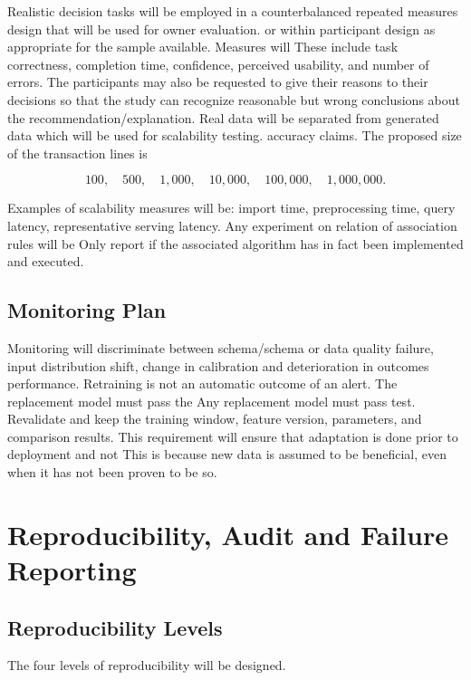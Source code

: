 \documentclass[a4paper,11pt,oneside]{book}
\theoremstyle{plain}
\theoremstyle{definition}
\theoremstyle{remark}
\begin{document}
Realistic decision tasks will be employed in a counterbalanced repeated measures design that will be used for owner evaluation. or within participant design as appropriate for the sample available. Measures will These include task correctness, completion time, confidence, perceived usability, and number of errors. The participants may also be requested to give their reasons to their decisions so that the study can recognize reasonable but wrong conclusions about the recommendation/explanation. Real data will be separated from generated data which will be used for scalability testing. accuracy claims. The proposed size of the transaction lines is

\[
100,\quad 500,\quad 1{,}000,\quad 10{,}000,\quad 100{,}000,\quad 1{,}000{,}000.
\]

Examples of scalability measures will be: import time, preprocessing time, query latency, representative serving latency. Any experiment on relation of association rules will be Only report if the associated algorithm has in fact been implemented and executed.

\subsection{Monitoring Plan}
\label{subsec:monitoring_plan}

Monitoring will discriminate between schema/schema or data quality failure, input distribution shift, change in calibration and deterioration in outcomes performance. Retraining is not an automatic outcome of an alert. The replacement model must pass the Any replacement model must pass test. Revalidate and keep the training window, feature version, parameters, and comparison results. This requirement will ensure that adaptation is done prior to deployment and not This is because new data is assumed to be beneficial, even when it has not been proven to be so.

\section{Reproducibility, Audit and Failure Reporting}
\label{sec:reproducibility_audit}

\subsection{Reproducibility Levels}
\label{subsec:reproducibility_levels}

The four levels of reproducibility will be designed.
\end{document}
